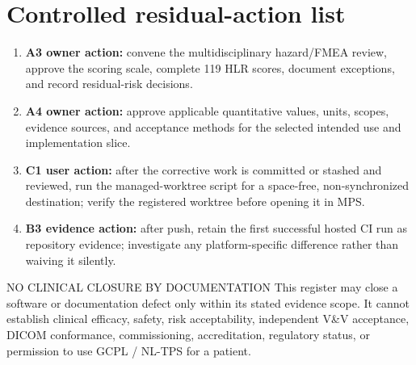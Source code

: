 \documentclass[11pt,letterpaper]{article}
\begin{document}
\section{Controlled residual-action list}

\begin{enumerate}
\item \textbf{A3 owner action:} convene the multidisciplinary hazard/FMEA review, approve the scoring scale, complete 119 HLR scores, document exceptions, and record residual-risk decisions.
\item \textbf{A4 owner action:} approve applicable quantitative values, units, scopes, evidence sources, and acceptance methods for the selected intended use and implementation slice.
\item \textbf{C1 user action:} after the corrective work is committed or stashed and reviewed, run the managed-worktree script for a space-free, non-synchronized destination; verify the registered worktree before opening it in MPS.
\item \textbf{B3 evidence action:} after push, retain the first successful hosted CI run as repository evidence; investigate any platform-specific difference rather than waiving it silently.
\end{enumerate}

\begin{nlnotice}{NO CLINICAL CLOSURE BY DOCUMENTATION}
This register may close a software or documentation defect only within its stated evidence scope. It cannot establish clinical efficacy, safety, risk acceptability, independent V\&V acceptance, DICOM conformance, commissioning, accreditation, regulatory status, or permission to use GCPL / NL-TPS for a patient.
\end{nlnotice}
\end{document}
